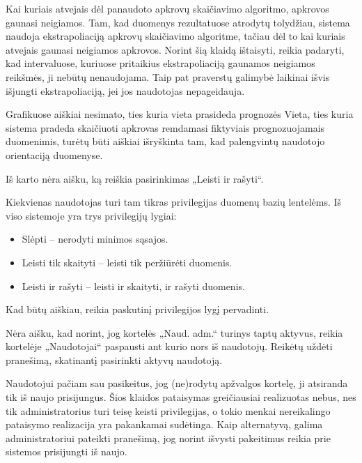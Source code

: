 {
  Kai kuriais atvejais dėl panaudoto apkrovų skaičiavimo algoritmo,
  apkrovos gaunasi neigiamos.
}
{
  Tam, kad duomenys rezultatuose atrodytų tolydžiau, sistema naudoja
  ekstrapoliaciją apkrovų skaičiavimo algoritme, tačiau dėl to kai kuriais
  atvejais gaunasi neigiamos apkrovos. Norint šią klaidą ištaisyti, reikia
  padaryti, kad intervaluose, kuriuose pritaikius ekstrapoliaciją gaunamos
  neigiamos reikšmės, ji nebūtų nenaudojama. Taip pat praverstų galimybė
  laikinai išvis išjungti ekstrapoliaciją, jei jos naudotojas nepageidauja.
}

{
  Grafikuose aiškiai nesimato, ties kuria vieta prasideda prognozės
}
{
  Vieta, ties kuria sistema pradeda skaičiuoti apkrovas remdamasi fiktyviais
  prognozuojamais duomenimis, turėtų būti aiškiai išryškinta tam, kad
  palengvintų naudotojo orientaciją duomenyse.
}

{
  Iš karto nėra aišku, ką reiškia pasirinkimas „Leisti ir rašyti“.
}
{
  Kiekvienas naudotojas turi tam tikras privilegijas duomenų bazių lentelėms.
  Iš viso sistemoje yra trys privilegijų lygiai:
  \begin{itemize}
    \item Slėpti – nerodyti minimos sąsajos.
    \item Leisti tik skaityti – leisti tik peržiūrėti duomenis.
    \item Leisti ir rašyti – leisti ir skaityti, ir rašyti duomenis.
  \end{itemize}
  Kad būtų aiškiau, reikia paskutinį privilegijos lygį pervadinti.
}

{
  Nėra aišku, kad norint, jog kortelės „Naud. adm.“ turinys taptų aktyvus,
  reikia kortelėje „Naudotojai“ paspausti ant kurio nors iš naudotojų.
}
{
  Reikėtų uždėti pranešimą, skatinantį pasirinkti aktyvų naudotoją.
}

{
  Naudotojui pačiam sau pasikeitus, jog (ne)rodytų apžvalgos kortelę, ji
  atsiranda tik iš naujo prisijungus.
}
{
  Šios klaidos pataisymas greičiausiai realizuotas nebus, nes tik administratorius
  turi teisę keisti privilegijas, o tokio menkai nereikalingo pataisymo realizacija
  yra pakankamai sudėtinga. Kaip alternatyvą, galima administratoriui pateikti pranešimą,
  jog norint išvysti pakeitimus reikia prie sistemos prisijungti iš naujo.
}

